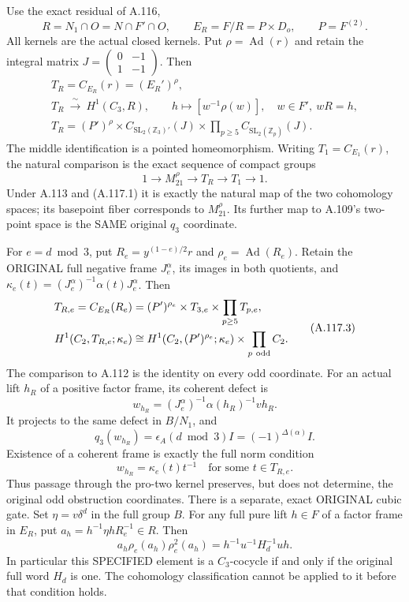 Use the exact residual of A.116,
\[
 R=N_1\cap O=N\cap F'\cap O,\qquad
 E_R=F/R=P\times D_o,\qquad P=F^{(2)}.
\]
All kernels are the actual closed kernels. Put
\(\rho=\operatorname{Ad}(r)\) and retain the integral matrix
\(J=\left(\begin{smallmatrix}0&-1\\1&-1\end{smallmatrix}\right)\).
Then
\[
 \begin{gathered}
 T_R=C_{E_R}(r)=(E_R')^\rho,\\
 T_R\ \xrightarrow{\ \sim\ }\ H^1(C_3,R),\qquad
 h\longmapsto[w^{-1}\rho(w)],\quad w\in F',\ wR=h,\\
 T_R=(P')^\rho\times C_{\mathrm{SL}_2(\mathbb Z_3)'}(J)
       \times\prod_{p\geq5}C_{\mathrm{SL}_2(\mathbb Z_p)}(J).
 \end{gathered}
 \tag{A.117.1}
\]
The middle identification is a pointed homeomorphism.
Writing \(T_1=C_{E_1}(r)\), the natural comparison is the exact
sequence of compact groups
\[
 1\longrightarrow M_{21}^\rho\longrightarrow T_R
                 \longrightarrow T_1\longrightarrow1.
 \tag{A.117.2}
\]
Under A.113 and (A.117.1) it is exactly the natural map of the
two cohomology spaces; its basepoint fiber corresponds to
\(M_{21}^\rho\). Its further map to A.109's two-point space
is the SAME original \(q_3\) coordinate.

For \(e=d\bmod3\), put \(R_e=y^{(1-e)/2}r\) and
\(\rho_e=\operatorname{Ad}(R_e)\). Retain the ORIGINAL full
negative frame \(J_e^\alpha\), its images in both quotients,
and \(\kappa_e(t)=(J_e^\alpha)^{-1}\alpha(t)J_e^\alpha\).
Then
\[
 \begin{split}
 T_{R,e}=C_{E_R}(R_e)
   &=(P')^{\rho_e}\times T_{3,e}\times\prod_{p\geq5}T_{p,e},\\
 H^1(C_2,T_{R,e};\kappa_e)
   &\cong H^1(C_2,(P')^{\rho_e};\kappa_e)
                   \times\prod_{p\ {\rm odd}}C_2.
 \end{split}
 \tag{A.117.3}
\]
The comparison to A.112 is the identity on every odd coordinate.
For an actual lift \(h_R\) of a positive factor frame, its coherent
defect is
\[
 w_{h_R}=(J_e^\alpha)^{-1}\alpha(h_R)^{-1}vh_R.
 \tag{A.117.4}
\]
It projects to the same defect in \(B/N_1\), and
\[
 q_3(w_{h_R})=\epsilon_A(d\bmod3)I=(-1)^{\Delta(\alpha)}I.
 \tag{A.117.5}
\]
Existence of a coherent frame is exactly the full norm condition
\[
       w_{h_R}=\kappa_e(t)t^{-1}\quad\text{for some }t\in T_{R,e}.
 \tag{A.117.6}
\]
Thus passage through the pro-two kernel preserves, but does not
determine, the original odd obstruction coordinates.
There is a separate, exact ORIGINAL cubic gate. Set
\(\eta=v\delta^d\) in the full group \(B\).
For any full pure lift \(h\in F\) of a factor frame in \(E_R\), put
\(a_h=h^{-1}\eta hR_e^{-1}\in R\). Then
\[
 a_h\rho_e(a_h)\rho_e^2(a_h)
             =h^{-1}u^{-1}H_d^{-1}uh.
 \tag{A.117.10}
\]
In particular this SPECIFIED element is a \(C_3\)-cocycle if and
only if the original full word \(H_d\) is one. The cohomology
classification cannot be applied to it before that condition holds.

